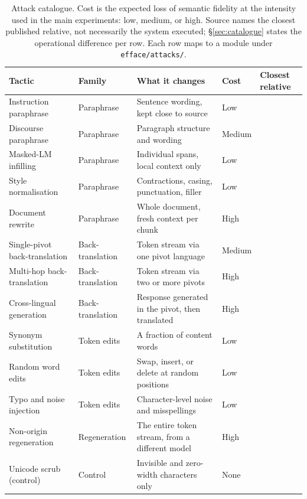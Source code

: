 \begin{table}[t]
\centering
\footnotesize
\caption{Attack catalogue. Cost is the expected loss of semantic fidelity at the intensity used in the main experiments: low, medium, or high. Source names the closest published relative, not necessarily the system executed; \S\ref{sec:catalogue} states the operational difference per row. Each row maps to a module under \texttt{efface/attacks/}.}
\label{tab:catalogue}
\begin{tabular}{@{}>{\raggedright\arraybackslash}p{3.4cm} >{\raggedright\arraybackslash}p{2.6cm} >{\raggedright\arraybackslash}p{3.5cm} l >{\raggedright\arraybackslash}p{3.3cm}@{}}
\toprule
Tactic & Family & What it changes & Cost & Closest relative \\
\midrule
Instruction paraphrase      & Paraphrase      & Sentence wording, kept close to source & Low    & \citet{kgwreliability} \\
Discourse paraphrase        & Paraphrase      & Paragraph structure and wording & Medium & \citet{dipper} \\
Masked-LM infilling         & Paraphrase      & Individual spans, local context only & Low & \citet{sira} \\
Style normalisation         & Paraphrase      & Contractions, casing, punctuation, filler & Low & \citet{markmywords} \\
Document rewrite            & Paraphrase      & Whole document, fresh context per chunk & High & \citet{dipper} \\
Single-pivot back-translation & Back-translation & Token stream via one pivot language & Medium & \citet{markmywords} \\
Multi-hop back-translation  & Back-translation & Token stream via two or more pivots & High & \citet{cwra} \\
Cross-lingual generation    & Back-translation & Response generated in the pivot, then translated & High & \citet{cwra} \\
Synonym substitution        & Token edits     & A fraction of content words & Low & \citet{threebricks} \\
Random word edits           & Token edits     & Swap, insert, or delete at random positions & Low & \citet{markmywords} \\
Typo and noise injection    & Token edits     & Character-level noise and misspellings & Low & \citet{markmywords} \\
Non-origin regeneration     & Regeneration    & The entire token stream, from a different model & High & \citet{cwra} \\
\midrule
Unicode scrub (control)     & Control         & Invisible and zero-width characters only & None & \citet{markmywords} \\
\bottomrule
\end{tabular}
\end{table}

